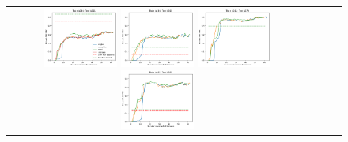 \begin{figure}[h!]
\begin{tabular}{cccc}
  \includegraphics[width=0.25\textwidth]{Kap5/rbf_ALL_LINKAGES_train=b234test=b261.png}  
  \includegraphics[width=0.25\textwidth]{Kap5/rbf_ALL_LINKAGES_train=b234test=b360.png}
  \includegraphics[width=0.25\textwidth]{Kap5/rbf_ALL_LINKAGES_train=b261test=b278.png}  
  \includegraphics[width=0.25\textwidth]{Kap5/rbf_ALL_LINKAGES_train=b261test=b360.png} \\


\end{tabular}
\end{figure}
